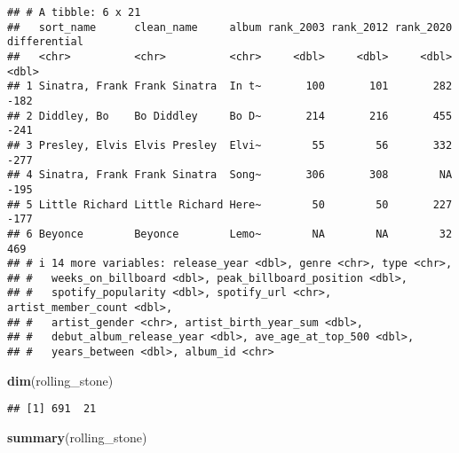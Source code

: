 \documentclass[
]{article}
\newenvironment{Shaded}{\begin{snugshade}}{\end{snugshade}}
\newcommand{\FunctionTok}[1]{\textcolor[rgb]{0.13,0.29,0.53}{\textbf{#1}}}
\newcommand{\NormalTok}[1]{#1}
\begin{document}
\begin{verbatim}
## # A tibble: 6 x 21
##   sort_name      clean_name     album rank_2003 rank_2012 rank_2020 differential
##   <chr>          <chr>          <chr>     <dbl>     <dbl>     <dbl>        <dbl>
## 1 Sinatra, Frank Frank Sinatra  In t~       100       101       282         -182
## 2 Diddley, Bo    Bo Diddley     Bo D~       214       216       455         -241
## 3 Presley, Elvis Elvis Presley  Elvi~        55        56       332         -277
## 4 Sinatra, Frank Frank Sinatra  Song~       306       308        NA         -195
## 5 Little Richard Little Richard Here~        50        50       227         -177
## 6 Beyonce        Beyonce        Lemo~        NA        NA        32          469
## # i 14 more variables: release_year <dbl>, genre <chr>, type <chr>,
## #   weeks_on_billboard <dbl>, peak_billboard_position <dbl>,
## #   spotify_popularity <dbl>, spotify_url <chr>, artist_member_count <dbl>,
## #   artist_gender <chr>, artist_birth_year_sum <dbl>,
## #   debut_album_release_year <dbl>, ave_age_at_top_500 <dbl>,
## #   years_between <dbl>, album_id <chr>
\end{verbatim}

\begin{Shaded}
\begin{Highlighting}[]
\FunctionTok{dim}\NormalTok{(rolling\_stone)}
\end{Highlighting}
\end{Shaded}

\begin{verbatim}
## [1] 691  21
\end{verbatim}

\begin{Shaded}
\begin{Highlighting}[]
\FunctionTok{summary}\NormalTok{(rolling\_stone)}
\end{Highlighting}
\end{Shaded}
\end{document}
